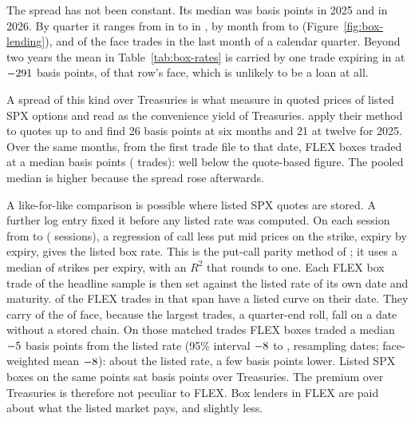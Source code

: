 \documentclass[11pt]{article}
\begin{document}
The spread has not been constant. Its median was \BoxRYearTwentyTwentyFive{} basis points
in 2025 and \BoxRYearTwentyTwentySix{} in 2026. By quarter it ranges from
\BoxRQuarterLow{} in \BoxRQuarterLowName{} to \BoxRQuarterHigh{} in
\BoxRQuarterHighName{}, by month from \BoxRMonthLow{} to \BoxRMonthHigh{}
(Figure~\ref{fig:box-lending}), and \BoxRQuarterEndShare{} of the face trades in the last
month of a calendar quarter. Beyond two years the mean in Table~\ref{tab:box-rates} is
carried by one \BoxRLongestLargestFace{} trade expiring in \BoxRLongestLargestYear{} at
$-291$ basis points, \BoxRLongestLargestShare{} of that row's face,
which is unlikely to be a loan at all.

A spread of this kind over Treasuries is what \citet{binsbergen2022} measure in quoted
prices of listed SPX options and read as the convenience yield of Treasuries.
\citet{kozlowski2025} apply their method to quotes up to \BoxRWindowEnd{} and find 26
basis points at six months and 21 at twelve for 2025. Over the same months, from the
first trade file to that date, FLEX boxes traded at a median \BoxRWindowMedian{} basis
points (\BoxRWindowTrades{} trades): well below the quote-based figure. The pooled median
is higher because the spread rose afterwards.

A like-for-like comparison is possible where listed SPX quotes are stored. A further log
entry fixed it before any listed rate was computed. On each session from \LBoxFirst{} to
\LBoxLast{} (\LBoxSessions{} sessions), a regression of call less put mid prices on the
strike, expiry by expiry, gives the listed box rate. This is the put-call parity method of
\citet{binsbergen2022}; it uses a median of \LBoxStrikes{} strikes per expiry, with an
$R^2$ that rounds to one. Each FLEX box trade of the headline sample is then set against
the listed rate of its own date and maturity. \LBoxMatched{} of the \LBoxWindowTrades{}
FLEX trades in that span have a listed curve on their date. They carry \LBoxFace{} of the
\LBoxWindowFace{} of face, because the largest trades, a quarter-end roll, fall on a date
without a stored chain. On those matched trades FLEX boxes traded a median
$-5$ basis points from the listed rate (95\% interval $-8$ to
\LBoxDiffCIHigh{}, resampling dates; face-weighted mean $-8$): about the
listed rate, a few basis points lower. Listed SPX boxes on the same points sat
\LBoxListedOverTsyMedian{} basis points over Treasuries. The premium over Treasuries is
therefore not peculiar to FLEX. Box lenders in FLEX are paid about what the listed market
pays, and slightly less.
\end{document}

